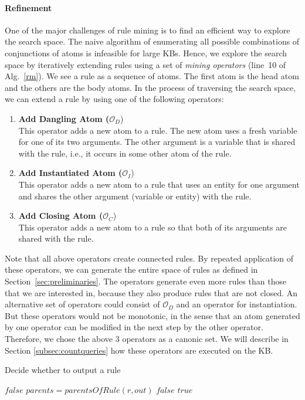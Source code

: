 \paragraph{Refinement}\label{subsubsec:refinement}
One of the major challenges of rule mining is to find an efficient way to explore the search space. 
The naive algorithm of enumerating all possible combinations of conjunctions of atoms is infeasible for large KBs.
Hence, we explore the search space by iteratively extending rules using a set of \emph{mining operators} (line~10 of Alg.~\ref{rm}).
We see a rule as a sequence of atoms. The first atom is the head atom and the others are the body atoms. 
In the process of traversing the search space, we can extend a rule by using one of the following operators:
\begin{enumerate}
\item \textbf{Add Dangling Atom ($\mathcal{O}_D$})\\
This operator adds a new atom to a rule. The new atom uses a fresh variable for one of its two arguments. The other argument is a variable
that is shared with the rule, i.e., it occurs in some other atom of the rule.
\item \textbf{Add Instantiated Atom ($\mathcal{O}_I$})\\
This operator adds a new atom to a rule that uses an entity for one argument and shares the other argument (variable or entity) with the rule.
\item \textbf{Add Closing Atom ($\mathcal{O}_C$})\\
This operator adds a new atom to a rule so that both of its arguments are shared with the rule.
\end{enumerate}
Note that all above operators create connected rules.
By repeated application of these operators, we can generate the entire space of rules as defined in Section~\ref{sec:preliminaries}.
The operators generate even more rules than those that we are interested in, because they also produce rules that are not closed.
An alternative set of operators could consist of $\mathcal{O}_D$ and an operator for instantiation.
But these operators would not be monotonic, in the sense that an atom generated by one operator can be modified in the next step by the other operator.
Therefore, we chose the above 3 operators as a canonic set. We will describe in Section \ref{subsec:countqueries} how these operators are executed on the KB.

\begin{algorithm}
\caption{Decide whether to output a rule}
\label{pfo}
\begin{algorithmic}[1]
      \State \Return $false$
    \EndIf 
    \State $parents = parentsOfRule(r, out)$
	\State \Return $false$
      \EndIf
    \EndFor
    \State \Return $true$
\EndFunction
\end{algorithmic}
\end{algorithm}

